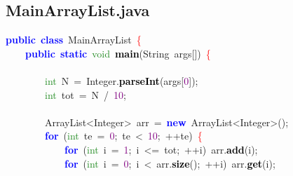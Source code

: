 \subsection{MainArrayList.java}
\noindent
\mbox{}\textbf{\textcolor{Blue}{public}}\ \textbf{\textcolor{Blue}{class}}\ \textcolor{TealBlue}{MainArrayList}\ \textcolor{Red}{\{} \\
\mbox{}\ \ \ \ \textbf{\textcolor{Blue}{public}}\ \textbf{\textcolor{Blue}{static}}\ \textcolor{ForestGreen}{void}\ \textbf{\textcolor{Black}{main}}\textcolor{BrickRed}{(}\textcolor{TealBlue}{String}\ args\textcolor{BrickRed}{[])}\ \textcolor{Red}{\{} \\
\mbox{}\ \ \ \ \ \ \ \  \\
\mbox{}\ \ \ \ \ \ \ \ \textcolor{ForestGreen}{int}\ N\ \textcolor{BrickRed}{=}\ Integer\textcolor{BrickRed}{.}\textbf{\textcolor{Black}{parseInt}}\textcolor{BrickRed}{(}args\textcolor{BrickRed}{[}\textcolor{Purple}{0}\textcolor{BrickRed}{]);} \\
\mbox{}\ \ \ \ \ \ \ \ \textcolor{ForestGreen}{int}\ tot\ \textcolor{BrickRed}{=}\ N\ \textcolor{BrickRed}{/}\ \textcolor{Purple}{10}\textcolor{BrickRed}{;} \\
\mbox{} \\
\mbox{}\ \ \ \ \ \ \ \ \textcolor{TealBlue}{ArrayList\textless{}Integer\textgreater{}}\ arr\ \textcolor{BrickRed}{=}\ \textbf{\textcolor{Blue}{new}}\ ArrayList\textcolor{BrickRed}{\textless{}}Integer\textcolor{BrickRed}{\textgreater{}();} \\
\mbox{}\ \ \ \ \ \ \ \ \textbf{\textcolor{Blue}{for}}\ \textcolor{BrickRed}{(}\textcolor{ForestGreen}{int}\ te\ \textcolor{BrickRed}{=}\ \textcolor{Purple}{0}\textcolor{BrickRed}{;}\ te\ \textcolor{BrickRed}{\textless{}}\ \textcolor{Purple}{10}\textcolor{BrickRed}{;}\ \textcolor{BrickRed}{++}te\textcolor{BrickRed}{)}\ \textcolor{Red}{\{} \\
\mbox{}\ \ \ \ \ \ \ \ \ \ \ \ \textbf{\textcolor{Blue}{for}}\ \textcolor{BrickRed}{(}\textcolor{ForestGreen}{int}\ i\ \textcolor{BrickRed}{=}\ \textcolor{Purple}{1}\textcolor{BrickRed}{;}\ i\ \textcolor{BrickRed}{\textless{}=}\ tot\textcolor{BrickRed}{;}\ \textcolor{BrickRed}{++}i\textcolor{BrickRed}{)}\ arr\textcolor{BrickRed}{.}\textbf{\textcolor{Black}{add}}\textcolor{BrickRed}{(}i\textcolor{BrickRed}{);} \\
\mbox{}\ \ \ \ \ \ \ \ \ \ \ \ \textbf{\textcolor{Blue}{for}}\ \textcolor{BrickRed}{(}\textcolor{ForestGreen}{int}\ i\ \textcolor{BrickRed}{=}\ \textcolor{Purple}{0}\textcolor{BrickRed}{;}\ i\ \textcolor{BrickRed}{\textless{}}\ arr\textcolor{BrickRed}{.}\textbf{\textcolor{Black}{size}}\textcolor{BrickRed}{();}\ \textcolor{BrickRed}{++}i\textcolor{BrickRed}{)}\ arr\textcolor{BrickRed}{.}\textbf{\textcolor{Black}{get}}\textcolor{BrickRed}{(}i\textcolor{BrickRed}{);} \\
